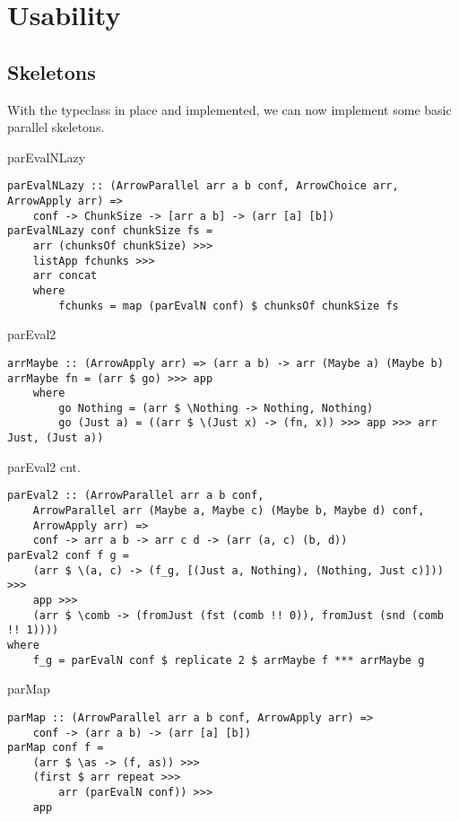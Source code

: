 \section{Usability}
\subsection{Skeletons}
\begin{frame}[fragile]
With the  typeclass in place and implemented, we can now implement some basic parallel skeletons.
\end{frame}

\begin{frame}[fragile]{parEvalNLazy}
\begin{lstlisting}[frame=htrbl]
parEvalNLazy :: (ArrowParallel arr a b conf, ArrowChoice arr, ArrowApply arr) =>
	conf -> ChunkSize -> [arr a b] -> (arr [a] [b])
parEvalNLazy conf chunkSize fs =
	arr (chunksOf chunkSize) >>>
	listApp fchunks >>>
	arr concat
	where
		fchunks = map (parEvalN conf) $ chunksOf chunkSize fs
\end{lstlisting}
\end{frame}

\begin{frame}[fragile]{parEval2}
\begin{lstlisting}[frame=htrbl]
arrMaybe :: (ArrowApply arr) => (arr a b) -> arr (Maybe a) (Maybe b)
arrMaybe fn = (arr $ go) >>> app
	where 
		go Nothing = (arr $ \Nothing -> Nothing, Nothing)
		go (Just a) = ((arr $ \(Just x) -> (fn, x)) >>> app >>> arr Just, (Just a))
\end{lstlisting}
\end{frame}

\begin{frame}[fragile]{parEval2 cnt.}
\begin{lstlisting}[frame=htrbl]
parEval2 :: (ArrowParallel arr a b conf,
	ArrowParallel arr (Maybe a, Maybe c) (Maybe b, Maybe d) conf,
	ArrowApply arr) =>
	conf -> arr a b -> arr c d -> (arr (a, c) (b, d))
parEval2 conf f g =
	(arr $ \(a, c) -> (f_g, [(Just a, Nothing), (Nothing, Just c)])) >>>
	app >>>
	(arr $ \comb -> (fromJust (fst (comb !! 0)), fromJust (snd (comb !! 1))))
where
	f_g = parEvalN conf $ replicate 2 $ arrMaybe f *** arrMaybe g
\end{lstlisting}
\end{frame}

\begin{frame}[fragile]{parMap}
\begin{lstlisting}[frame=htrbl]
parMap :: (ArrowParallel arr a b conf, ArrowApply arr) =>
	conf -> (arr a b) -> (arr [a] [b])
parMap conf f =
	(arr $ \as -> (f, as)) >>>
	(first $ arr repeat >>>
		arr (parEvalN conf)) >>>
	app
\end{lstlisting}
\end{frame}

